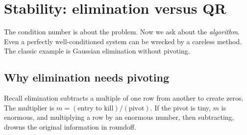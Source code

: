 \section{Stability: elimination versus QR}

The condition number is about the problem. Now we ask about the \emph{algorithm}. Even
a perfectly well-conditioned system can be wrecked by a careless method. The classic
example is Gaussian elimination without pivoting.

\subsection{Why elimination needs pivoting}

Recall elimination subtracts a multiple of one row from another to create zeros. The
multiplier is $m = (\text{entry to kill})/(\text{pivot})$. If the pivot is tiny, $m$ is
enormous, and multiplying a row by an enormous number, then subtracting, drowns the
original information in roundoff.

